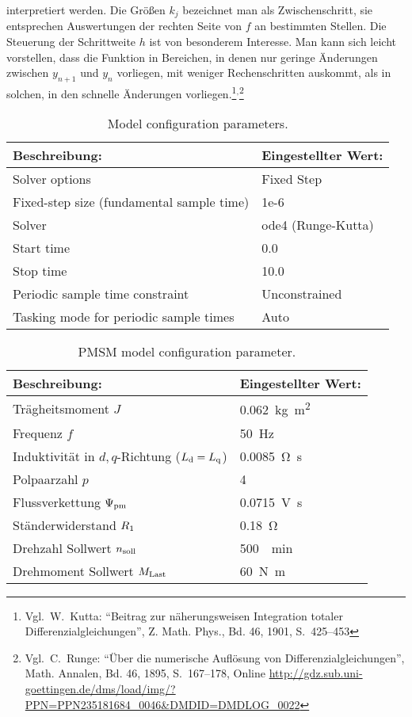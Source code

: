 interpretiert werden.
Die Größen $k_j$ bezeichnet man als Zwischenschritt, sie entsprechen Auswertungen der rechten Seite von $f$ an bestimmten Stellen.
Die Steuerung der Schrittweite $h$ ist von besonderem Interesse.
Man kann sich leicht vorstellen, dass die Funktion in Bereichen, in denen nur geringe Änderungen zwischen $y_{n+1}$ und $y_n$ vorliegen, mit weniger Rechenschritten auskommt, als in solchen, in den schnelle Änderungen vorliegen.\footnote{Vgl.~W.\ Kutta: \enquote{Beitrag zur näherungsweisen Integration totaler Differenzialgleichungen}, Z. Math. Phys., Bd. 46, 1901, S.~425--453}$^,$\footnote{Vgl.~C.\ Runge: \enquote{Über die numerische Auflösung von Differenzialgleichungen}, Math. Annalen, Bd. 46, 1895, S.~167--178, Online \url{http://gdz.sub.uni-goettingen.de/dms/load/img/?PPN=PPN235181684_0046&DMDID=DMDLOG_0022}}


\begin{table}[h!]
	\centering
	\caption{Model configuration parameters.}
	\label{tab:model-parameter}
	\begin{tabularx}{0.8\textwidth}{ll}
		\toprule
		Beschreibung: & Eingestellter Wert: \\
		\midrule
		Solver options	& Fixed Step\\
		Fixed-step size (fundamental sample time)	& 1e-6 \\
		Solver	& ode4 (Runge-Kutta) \\
		Start time & 0.0 \\
		Stop time & 10.0\\
		Periodic sample time constraint & Unconstrained \\
		Tasking mode for periodic sample times & Auto \\
		\bottomrule
	\end{tabularx}
\end{table}
\begin{table}[h!]
	\centering
	\caption{PMSM model configuration parameter.}
	\label{tab:pmsm-parameter}
	\begin{tabularx}{0.8\textwidth}{ll}
		\toprule
		Beschreibung: & Eingestellter Wert: \\
		\midrule
		Trägheitsmoment $J$ & \SI{0.062}{\kilogram\square\meter} \\
		Frequenz $f$ & \SI{50}{\hertz}\\
		Induktivität in $d,q$-Richtung ($L_{\mathrm{d}}=L_{\mathrm{q}}$) & \SI{0.0085}{\ohm\second}\\
		Polpaarzahl $p$ & 4 \\
		Flussverkettung $\Psi_{\mathrm{pm}}$ & \SI{0.0715}{\volt\second}\\
		Ständerwiderstand $R_{\mathrm{1}}$ & \SI{0.18}{\ohm}\\
		Drehzahl Sollwert $n_{\mathrm{soll}}$ & \SI{500}{\per\minute}\\
		Drehmoment Sollwert $M_{\mathrm{Last}}$ & \SI{60}{\newton\meter}\\
		\bottomrule
	\end{tabularx}
\end{table}
\newpage

